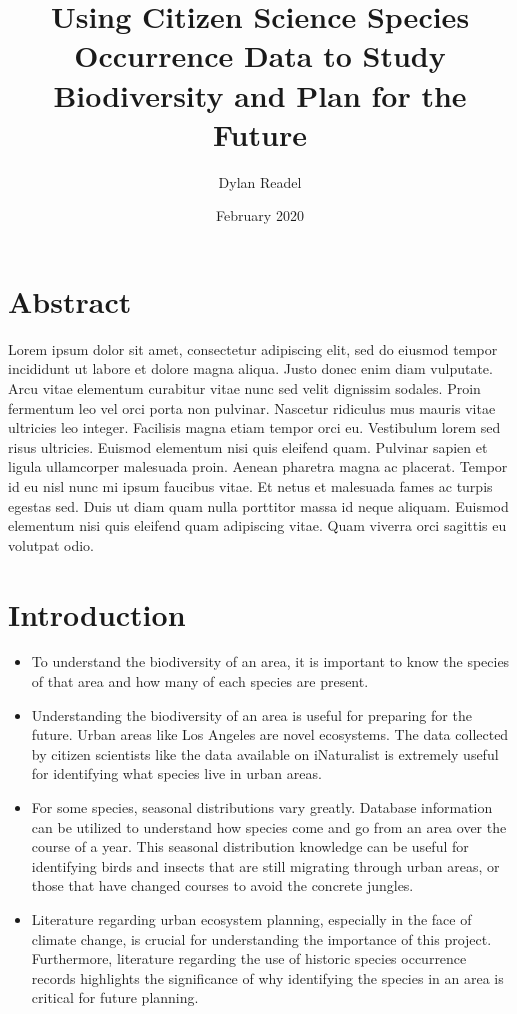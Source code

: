 \documentclass[letterpaper]{article}
\title{Using Citizen Science Species Occurrence Data to Study Biodiversity and Plan for the Future}
\author{Dylan Readel}
\date{February 2020}
\begin{document}
\maketitle

\section*{Abstract}

Lorem ipsum dolor sit amet, consectetur adipiscing elit, sed do eiusmod tempor incididunt ut labore et dolore magna aliqua. Justo donec enim diam vulputate. Arcu vitae elementum curabitur vitae nunc sed velit dignissim sodales. Proin fermentum leo vel orci porta non pulvinar. Nascetur ridiculus mus mauris vitae ultricies leo integer. Facilisis magna etiam tempor orci eu. Vestibulum lorem sed risus ultricies. Euismod elementum nisi quis eleifend quam. Pulvinar sapien et ligula ullamcorper malesuada proin. Aenean pharetra magna ac placerat. Tempor id eu nisl nunc mi ipsum faucibus vitae. Et netus et malesuada fames ac turpis egestas sed. Duis ut diam quam nulla porttitor massa id neque aliquam. Euismod elementum nisi quis eleifend quam adipiscing vitae. Quam viverra orci sagittis eu volutpat odio.

\newpage

\tableofcontents
\listoffigures

\newpage

\section{Introduction}

\begin{itemize} \itemsep -0.15cm
	\item To understand the biodiversity of an area, it is important to know the species of that area and how many of each species are present.
	\item Understanding the biodiversity of an area is useful for preparing for the future. Urban areas like Los Angeles are novel ecosystems. The data collected by citizen scientists like the data available on iNaturalist is extremely useful for identifying what species live in urban areas. 
	\item For some species, seasonal distributions vary greatly. Database information can be utilized to understand how species come and go from an area over the course of a year. This seasonal distribution knowledge can be useful for identifying birds and insects that are still migrating through urban areas, or those that have changed courses to avoid the concrete jungles. 
	\item Literature regarding urban ecosystem planning, especially in the face of climate change, is crucial for understanding the importance of this project. Furthermore, literature regarding the use of historic species occurrence records highlights the significance of why identifying the species in an area is critical for future planning.
	
\end{itemize}
\end{document}

